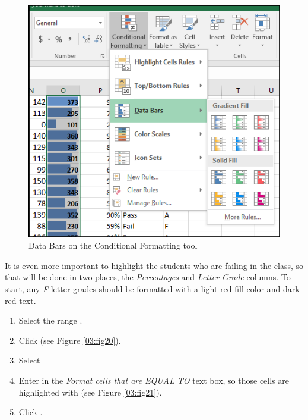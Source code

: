 \begin{figure}[H]
	\centering
	\includegraphics[width=\maxwidth{.95\linewidth}]{gfx/ch03_fig19}
	\caption{Data Bars on the Conditional Formatting tool}
	\label{03:fig19}
\end{figure}

It is even more important to highlight the students who are failing in the class, so that will be done in two places, the \textit{Percentages} and \textit{Letter Grade} columns. To start, any \textit{F} letter grades should be formatted with a light red fill color and dark red text.

\begin{enumerate}
	\item Select the range .
	\item Click  (see Figure \ref{03:fig20}).
	\item Select 
	\item Enter  in the \textit{Format cells that are EQUAL TO} text box, so those cells are highlighted with  (see Figure \ref{03:fig21}).
	\item Click .
\end{enumerate}

